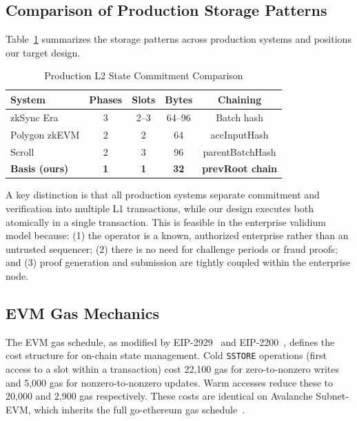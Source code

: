 \subsection{Comparison of Production Storage Patterns}

Table~\ref{tab:production-comparison} summarizes the storage patterns across production
systems and positions our target design.

\begin{table}[htbp]
\centering
\caption{Production L2 State Commitment Comparison}
\label{tab:production-comparison}
\small
\begin{tabular}{@{}lcccc@{}}
\toprule
\textbf{System} & \textbf{Phases} & \textbf{Slots} & \textbf{Bytes} & \textbf{Chaining} \\
\midrule
zkSync Era       & 3 & 2--3 & 64--96 & Batch hash \\
Polygon zkEVM    & 2 & 2    & 64     & accInputHash \\
Scroll           & 2 & 3    & 96     & parentBatchHash \\
\midrule
\textbf{Basis (ours)} & \textbf{1} & \textbf{1} & \textbf{32} & \textbf{prevRoot chain} \\
\bottomrule
\end{tabular}
\end{table}

A key distinction is that all production systems separate commitment and verification into
multiple L1 transactions, while our design executes both atomically in a single transaction.
This is feasible in the enterprise validium model because: (1) the operator is a known,
authorized enterprise rather than an untrusted sequencer; (2) there is no need for
challenge periods or fraud proofs; and (3) proof generation and submission are tightly
coupled within the enterprise node.

\subsection{EVM Gas Mechanics}

The EVM gas schedule, as modified by EIP-2929~\cite{eip2929} and EIP-2200~\cite{eip2200},
defines the cost structure for on-chain state management. Cold \texttt{SSTORE} operations
(first access to a slot within a transaction) cost 22,100 gas for zero-to-nonzero writes
and 5,000 gas for nonzero-to-nonzero updates. Warm accesses reduce these to 20,000 and
2,900 gas respectively. These costs are identical on Avalanche Subnet-EVM, which inherits
the full go-ethereum gas schedule~\cite{avalanche2024subnetdocs}.

